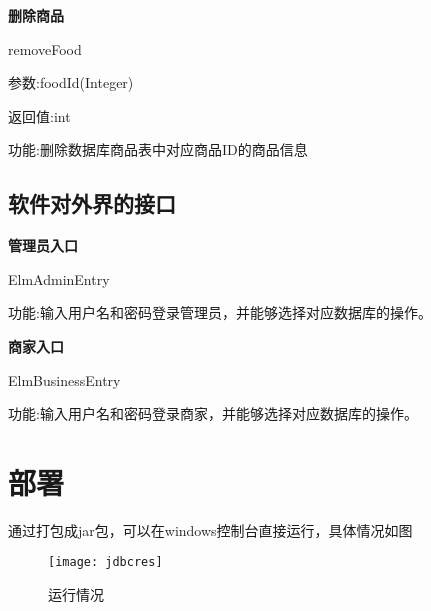 \textbf{删除商品}

removeFood

参数:foodId(Integer)

返回值:int

功能:删除数据库商品表中对应商品ID的商品信息

\subsection{软件对外界的接口}
\textbf{管理员入口}

ElmAdminEntry

功能:输入用户名和密码登录管理员，并能够选择对应数据库的操作。

\textbf{商家入口}

ElmBusinessEntry

功能:输入用户名和密码登录商家，并能够选择对应数据库的操作。

\section{部署}
通过打包成jar包，可以在windows控制台直接运行，具体情况如图
\begin{figure}[htbp]
	\centering
	\texttt{[image: jdbcres]}
	\caption{运行情况}
	\vspace{\baselineskip}
\end{figure}
